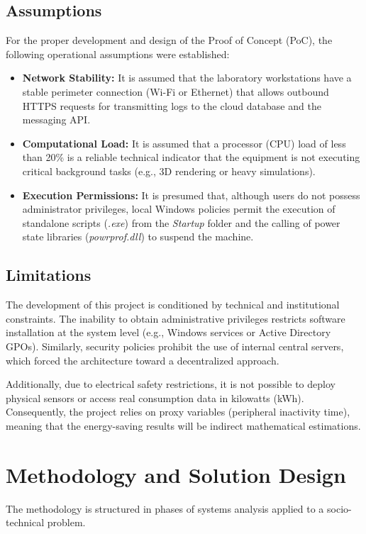 \documentclass[12pt,a4paper]{article}
\begin{document}
\subsection{Assumptions}
For the proper development and design of the Proof of Concept (PoC), the following operational assumptions were established:
\begin{itemize}
    \item \textbf{Network Stability:} It is assumed that the laboratory workstations have a stable perimeter connection (Wi-Fi or Ethernet) that allows outbound HTTPS requests for transmitting logs to the cloud database and the messaging API.
    \item \textbf{Computational Load:} It is assumed that a processor (CPU) load of less than 20\% is a reliable technical indicator that the equipment is not executing critical background tasks (e.g., 3D rendering or heavy simulations).
    \item \textbf{Execution Permissions:} It is presumed that, although users do not possess administrator privileges, local Windows policies permit the execution of standalone scripts (\textit{.exe}) from the \textit{Startup} folder and the calling of power state libraries (\textit{powrprof.dll}) to suspend the machine.
\end{itemize}

\subsection{Limitations}
The development of this project is conditioned by technical and institutional constraints. The inability to obtain administrative privileges restricts software installation at the system level (e.g., Windows services or Active Directory GPOs). Similarly, security policies prohibit the use of internal central servers, which forced the architecture toward a decentralized approach.

Additionally, due to electrical safety restrictions, it is not possible to deploy physical sensors or access real consumption data in kilowatts (kWh). Consequently, the project relies on proxy variables (peripheral inactivity time), meaning that the energy-saving results will be indirect mathematical estimations.

\section{Methodology and Solution Design}
The methodology is structured in phases of systems analysis applied to a socio-technical problem.
\end{document}
